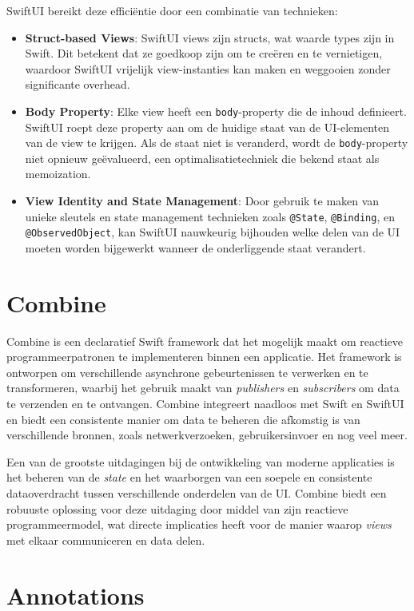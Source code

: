 SwiftUI bereikt deze efficiëntie door een combinatie van technieken:

\begin{itemize}
    \item \textbf{Struct-based Views}: SwiftUI views zijn structs, wat waarde types zijn in Swift. Dit betekent dat ze goedkoop zijn om te creëren en te vernietigen, waardoor SwiftUI vrijelijk view-instanties kan maken en weggooien zonder significante overhead.
    \item \textbf{Body Property}: Elke view heeft een \texttt{body}-property die de inhoud definieert. SwiftUI roept deze property aan om de huidige staat van de UI-elementen van de view te krijgen. Als de staat niet is veranderd, wordt de \texttt{body}-property niet opnieuw geëvalueerd, een optimalisatietechniek die bekend staat als memoization.
    \item \textbf{View Identity and State Management}: Door gebruik te maken van unieke sleutels en state management technieken zoals \texttt{@State}, \texttt{@Binding}, en \texttt{@ObservedObject}, kan SwiftUI nauwkeurig bijhouden welke delen van de UI moeten worden bijgewerkt wanneer de onderliggende staat verandert.
\end{itemize}

\section{Combine}
\autocite{AppleCombine} Combine is een declaratief Swift framework dat het mogelijk maakt om reactieve programmeerpatronen te implementeren binnen een applicatie. Het framework is ontworpen om verschillende asynchrone gebeurtenissen te verwerken en te transformeren, waarbij het gebruik maakt van \textit{publishers} en \textit{subscribers} om data te verzenden en te ontvangen. Combine integreert naadloos met Swift en SwiftUI en biedt een consistente manier om data te beheren die afkomstig is van verschillende bronnen, zoals netwerkverzoeken, gebruikersinvoer en nog veel meer. 

Een van de grootste uitdagingen bij de ontwikkeling van moderne applicaties is het beheren van de \textit{state} en het waarborgen van een soepele en consistente dataoverdracht tussen verschillende onderdelen van de UI. Combine biedt een robuuste oplossing voor deze uitdaging door middel van zijn reactieve programmeermodel, wat directe implicaties heeft voor de manier waarop \textit{views} met elkaar communiceren en data delen.

\section{Annotations}
